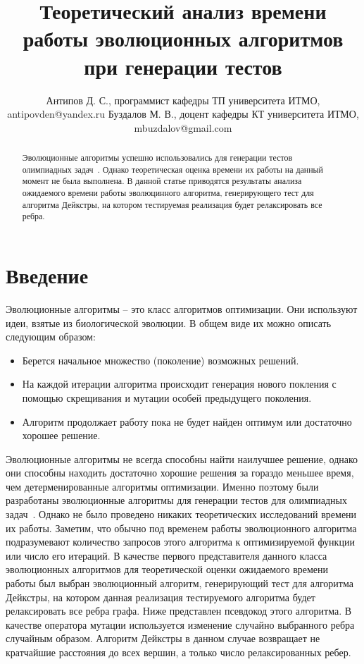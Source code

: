 \documentclass{spisok-article}
\title{Теоретический анализ времени работы эволюционных алгоритмов при генерации тестов
}
\author{
  Антипов Д. С.,
  программист кафедры ТП университета ИТМО,
  antipovden@yandex.ru
  Буздалов М. В.,
  доцент кафедры КТ университета ИТМО,
  mbuzdalov@gmail.com
}
\begin{document}
\maketitle

\begin{abstract}
Эволюционные алгоритмы успешно использовались для генерации тестов олимпиадных задач~\cite{max}.
Однако теоретическая оценка времени их работы на данный момент не была выполнена.
В данной статье приводятся результаты анализа ожидаемого времени работы эволюцинного алгоритма,
генерирующего тест для алгоритма Дейкстры, на котором тестируемая реализация будет релаксировать все ребра.
\end{abstract}

\section{Введение}
Эволюционные алгоритмы -- это класс алгоритмов оптимизации. Они используют идеи, взятые из биологической эволюции. В общем виде их можно описать следующим образом:
\begin{itemize}
 \item Берется начальное множество (поколение) возможных решений.
 \item На каждой итерации алгоритма происходит генерация нового покления с помощью скрещивания и мутации особей предыдущего поколения.
 \item Алгоритм продолжает работу пока не будет найден оптимум или достаточно хорошее решение.
\end{itemize}
Эволюционные алгоритмы не всегда способны найти наилучшее решение, однако они способны находить достаточно хорошие решения за гораздо меньшее время, чем детерменированные алгоритмы оптимизации. 
Именно поэтому были разработаны эволюционные алгоритмы для генерации тестов для олимпиадных задач~\cite{max}. Однако не было проведено никаких теоретических исследований времени их работы. Заметим, что обычно под временем работы эволюционного алгоритма подразумевают количество запросов этого алгоритма к оптимизируемой функции или число его итераций.
В качестве первого представителя данного класса эволюционных алгоритмов для теоретической оценки ожидаемого времени работы был выбран эволюционный алгоритм, генерирующий тест для алгоритма Дейкстры, на котором данная реализация тестируемого алгоритма будет релаксировать все ребра графа. Ниже представлен псевдокод этого алгоритма. 
В качестве оператора мутации используется изменение случайно выбранного ребра случайным образом.
Алгоритм Дейкстры в данном случае возвращает не кратчайшие расстояния до всех вершин, а только число релаксированных ребер.
\end{document}
